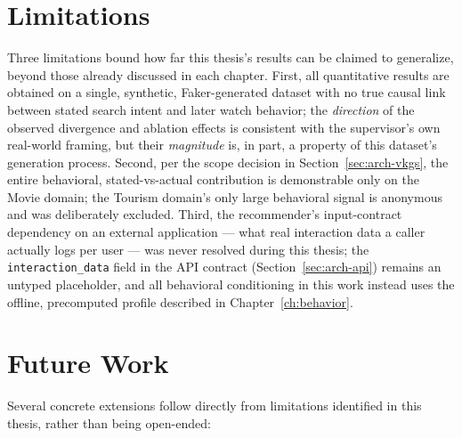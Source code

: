 \documentclass[11pt,a4paper,oneside]{book}
\newcommand{\code}[1]{\texttt{#1}}
\begin{document}
\section{Limitations}
\label{sec:conclusion-limits}

Three limitations bound how far this thesis's results can be claimed to generalize, beyond those
already discussed in each chapter. First, all quantitative results are obtained on a single,
synthetic, Faker-generated dataset with no true causal link between stated search intent and later
watch behavior; the \emph{direction} of the observed divergence and ablation effects is consistent
with the supervisor's own real-world framing, but their \emph{magnitude} is, in part, a property of
this dataset's generation process. Second, per the scope decision in
Section~\ref{sec:arch-vkgs}, the entire behavioral, stated-vs-actual contribution is demonstrable
only on the Movie domain; the Tourism domain's only large behavioral signal is anonymous and was
deliberately excluded. Third, the recommender's input-contract dependency on an external
application --- what real interaction data a caller actually logs per user --- was never resolved
during this thesis; the \code{interaction\_data} field in the API contract
(Section~\ref{sec:arch-api}) remains an untyped placeholder, and all behavioral conditioning in this
work instead uses the offline, precomputed profile described in Chapter~\ref{ch:behavior}.

\section{Future Work}
\label{sec:conclusion-future}

Several concrete extensions follow directly from limitations identified in this thesis, rather than
being open-ended:
\end{document}
